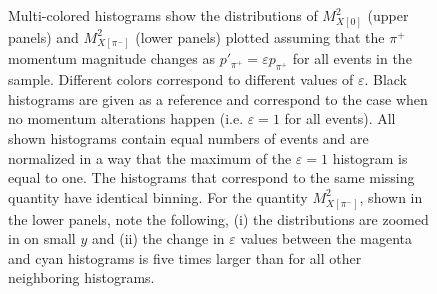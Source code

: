 \afterpage{\clearpage}
\begin{figure}[htp]
\begin{center}
\caption{\small Multi-colored histograms show the distributions of $M_{X[0]}^{2}$ (upper panels) and $M_{X[\pi^{-}]}^{2}$ (lower panels) plotted assuming that the $\pi^{+}$ momentum magnitude changes as $p'_{\pi^{+}} = \varepsilon p_{\pi^{+}}$ for all events in the sample. Different colors correspond to different values of $\varepsilon$. Black histograms are given as a reference and correspond to the case when no momentum alterations happen (i.e. $\varepsilon = 1$ for all events). All shown histograms contain equal numbers of events and are normalized in a way that the maximum of the $\varepsilon=1$  histogram is equal to one. The histograms that correspond to the same missing quantity have identical binning. For the quantity $M_{X[\pi^{-}]}^{2}$, shown in the lower panels, note the following, (i) the distributions are zoomed in on small $y$ and (ii) the change in $\varepsilon$ values between the magenta and cyan histograms is five times larger than for all other neighboring histograms. } \label{fig:mm_pip_fsi}
\end{center}
\end{figure}

